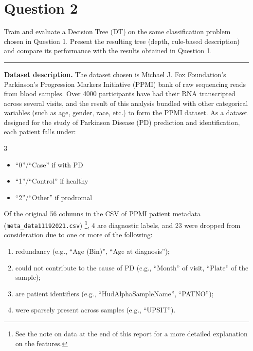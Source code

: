 \section{Question 2}
Train and evaluate a Decision Tree (DT) on the same classification problem chosen in Question 1. 
Present the resulting tree (depth, rule-based description) 
and compare its performance with the results obtained in Question 1.

\noindent\rule{\textwidth}{.5pt}

\noindent\textbf{Dataset description.}
    The dataset chosen is Michael J. Fox Foundation's Parkinson's Progression Markers Initiative (PPMI)
    bank of raw sequencing reads from blood samples.
    Over 4000 participants have had their RNA transcripted across several visits,
    and the result of this analysis bundled with other categorical variables 
    (such as age, gender, race, etc.) to form the PPMI dataset.
    As a dataset designed for the study of Parkinson Disease (PD) prediction and identification,
    each patient falls under:
    \begin{multicols}{3}
        \begin{itemize}
            \item ``0''/``Case'' if with PD
            \item ``1''/``Control'' if healthy
            \item ``2''/``Other'' if prodromal
        \end{itemize}        
    \end{multicols}

    Of the original 56 columns in the CSV of PPMI patient metadata (\texttt{meta\_data11192021.csv})%
    \footnote{
        See the note on data at the end of this report for a more detailed explanation on the features. 
    }, 
    4 are diagnostic labels, and 23 were dropped from consideration due to one or more of the following: 
    \begin{enumerate}
        \item [(i)] redundancy (e.g., ``Age (Bin)'', ``Age at diagnosis'');
        \item [(ii)] could not contribute to the cause of PD (e.g., ``Month'' of visit, ``Plate'' of the sample);
        \item [(iii)] are patient identifiers (e.g., ``HudAlphaSampleName'', ``PATNO'');
        \item [(iv)] were sparsely present across samples (e.g., ``UPSIT'').
    \end{enumerate}

